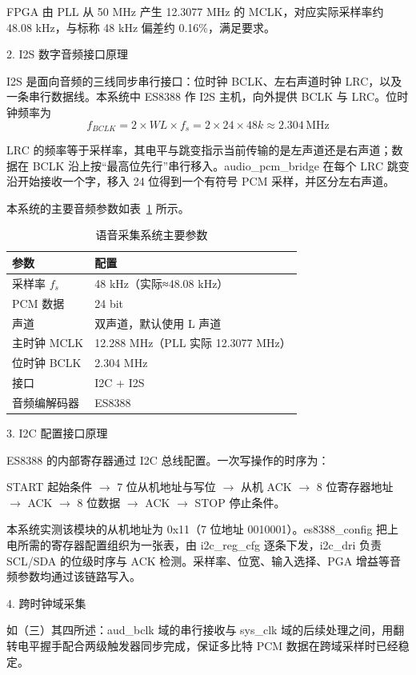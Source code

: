 \documentclass[UTF8,zihao=-4,fontset=windows]{ctexart}
\newcommand{\code}[1]{{\ttfamily #1}}
\newcommand{\subhead}[1]{%
  \par\medskip
  {\heiti\zihao{-4}#1}
  \nopagebreak
  \par\smallskip
}
\begin{document}
FPGA 由 PLL 从 50 MHz 产生 12.3077 MHz 的 MCLK，对应实际采样率约 48.08 kHz，与标称 48 kHz 偏差约 0.16\%，满足要求。

\subhead{2. I2S 数字音频接口原理}

I2S 是面向音频的三线同步串行接口：位时钟 BCLK、左右声道时钟 LRC，以及一条串行数据线。本系统中 ES8388 作 I2S 主机，向外提供 BCLK 与 LRC。位时钟频率为
\[
f_{BCLK}=2\times WL\times f_s=2\times 24\times 48k\approx 2.304\,\mathrm{MHz}
\]

LRC 的频率等于采样率，其电平与跳变指示当前传输的是左声道还是右声道；数据在 BCLK 沿上按“最高位先行”串行移入。\code{audio\_pcm\_bridge} 在每个 LRC 跳变沿开始接收一个字，移入 24 位得到一个有符号 PCM 采样，并区分左右声道。

本系统的主要音频参数如表~\ref{tab:audio} 所示。

\begin{table}[H]
\centering
\caption{语音采集系统主要参数}
\label{tab:audio}
\begin{tabular}{p{5cm}p{7cm}}
\toprule
参数 & 配置 \\
\midrule
采样率 $f_s$ & 48 kHz（实际≈48.08 kHz）\\
PCM 数据 & 24 bit \\
声道 & 双声道，默认使用 L 声道 \\
主时钟 MCLK & 12.288 MHz（PLL 实际 12.3077 MHz）\\
位时钟 BCLK & 2.304 MHz \\
接口 & I2C + I2S \\
音频编解码器 & ES8388 \\
\bottomrule
\end{tabular}
\end{table}

\subhead{3. I2C 配置接口原理}

ES8388 的内部寄存器通过 I2C 总线配置。一次写操作的时序为：

START 起始条件 $\rightarrow$ 7 位从机地址与写位 $\rightarrow$ 从机 ACK $\rightarrow$ 8 位寄存器地址 $\rightarrow$ ACK $\rightarrow$ 8 位数据 $\rightarrow$ ACK $\rightarrow$ STOP 停止条件。

本系统实测该模块的从机地址为 0x11（7 位地址 0010001）。\code{es8388\_config} 把上电所需的寄存器配置组织为一张表，由 \code{i2c\_reg\_cfg} 逐条下发，\code{i2c\_dri} 负责 SCL/SDA 的位级时序与 ACK 检测。采样率、位宽、输入选择、PGA 增益等音频参数均通过该链路写入。

\subhead{4. 跨时钟域采集}

如（三）其四所述：\code{aud\_bclk} 域的串行接收与 \code{sys\_clk} 域的后续处理之间，用翻转电平握手配合两级触发器同步完成，保证多比特 PCM 数据在跨域采样时已经稳定。
\end{document}
